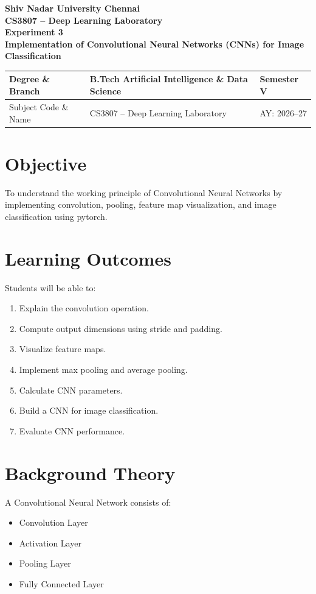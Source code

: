 \documentclass[11pt]{article}
\begin{document}
\begin{center}
{\Large\textbf{Shiv Nadar University Chennai}}\\
\textbf{CS3807 -- Deep Learning Laboratory}\\
\textbf{Experiment 3}\\
{\large\textbf{Implementation of Convolutional Neural Networks (CNNs) for Image Classification}}
\end{center}

\renewcommand{\arraystretch}{1.25}

\begin{tabular}{|p{3.8cm}|p{8cm}|p{2cm}|}
\hline
Degree \& Branch & B.Tech Artificial Intelligence \& Data Science & Semester V\\ \hline
Subject Code \& Name & CS3807 -- Deep Learning Laboratory & AY: 2026--27\\ \hline
\end{tabular}

\section{Objective}
To understand the working principle of Convolutional Neural Networks by implementing convolution, pooling, feature map visualization, and image classification using pytorch. 

\section{Learning Outcomes}
Students will be able to: 
\begin{enumerate}
    \item Explain the convolution operation. 
    \item Compute output dimensions using stride and padding. 
    \item Visualize feature maps. 
    \item Implement max pooling and average pooling. 
    \item Calculate CNN parameters. 
    \item Build a CNN for image classification. 
    \item Evaluate CNN performance. 
\end{enumerate}

\section{Background Theory}
A Convolutional Neural Network consists of: 
\begin{itemize}
    \item Convolution Layer 
    \item Activation Layer 
    \item Pooling Layer 
    \item Fully Connected Layer 
\end{itemize}
\end{document}

